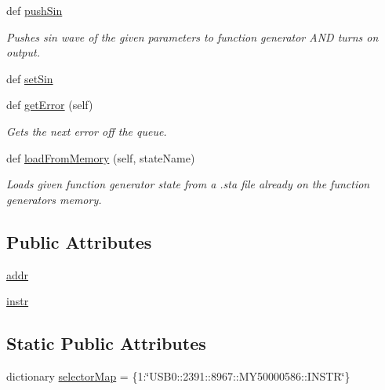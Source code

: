 \begin{DoxyCompactItemize}
def \hyperlink{class_function_generator_1_1_function_generator_a35c5bc4df66d86595b825e13aba94c1a}{push\+Sin}
\begin{DoxyCompactList}\small\item\em Pushes sin wave of the given parameters to function generator A\+N\+D turns on output. \end{DoxyCompactList}\item 
def \hyperlink{class_function_generator_1_1_function_generator_a2f5cd14920dd4119f21ec9dca71481c4}{set\+Sin}
\item 
def \hyperlink{class_function_generator_1_1_function_generator_a93a5580a96697fa28f311dd7bdb1c63f}{get\+Error} (self)
\begin{DoxyCompactList}\small\item\em Gets the next error off the queue. \end{DoxyCompactList}\item 
def \hyperlink{class_function_generator_1_1_function_generator_a600d8bcdc6ee83dfdff2a55e6f1c14ba}{load\+From\+Memory} (self, state\+Name)
\begin{DoxyCompactList}\small\item\em Loads given function generator state from a .sta file already on the function generator\textquotesingle{}s memory. \end{DoxyCompactList}\end{DoxyCompactItemize}
\subsection*{Public Attributes}
\begin{DoxyCompactItemize}
\item 
\hyperlink{class_function_generator_1_1_function_generator_a6232661c93750461489cadd41b721d56}{addr}
\item 
\hyperlink{class_function_generator_1_1_function_generator_a31f74674e20ebd808c28abf817cafccf}{instr}
\end{DoxyCompactItemize}
\subsection*{Static Public Attributes}
\begin{DoxyCompactItemize}
\item 
dictionary \hyperlink{class_function_generator_1_1_function_generator_af0f7aaea68bd468c28524373f6005d8f}{selector\+Map} = \{1\+:\char`\"{}U\+S\+B0\+::2391\+::8967\+::\+M\+Y50000586\+::\+I\+N\+S\+T\+R\char`\"{}\}
\end{DoxyCompactItemize}



